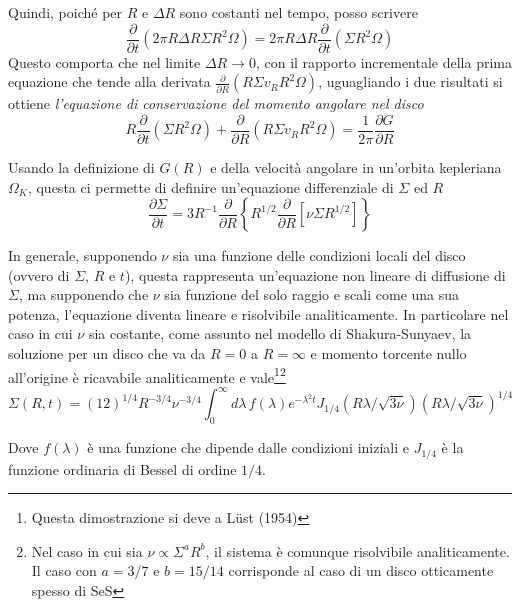 \documentclass[a4paperbi]{article}
\begin{document}
	Quindi, poiché per $R$ e $\Delta R$ sono costanti nel tempo, posso scrivere
	\begin{equation}
		\frac{\partial}{\partial t}(2\pi R\Delta R\Sigma R^2\Omega)=2\pi R\Delta R\frac{\partial}{\partial t}(\Sigma R^2\Omega)
	\end{equation}
	Questo comporta che nel limite $\Delta R\rightarrow 0$, con il rapporto incrementale della prima equazione che tende alla derivata $\frac{\partial}{\partial R}(R\Sigma v_R R^2\Omega)$, uguagliando i due risultati si ottiene \textit{l'equazione di conservazione del momento angolare nel disco}
	\begin{equation}
		R\frac{\partial}{\partial t}(\Sigma R^2\Omega)+\frac{\partial}{\partial R}(R\Sigma v_R R^2\Omega)=\frac{1}{2\pi}\frac{\partial G}{\partial R}
	\end{equation}
	
	Usando la definizione di $G(R)$ e della velocità angolare in un'orbita kepleriana $\Omega_K$,  questa ci permette di definire un'equazione differenziale di $\Sigma$ ed $R$
	\begin{equation}
		\frac{\partial\Sigma}{\partial t}=3R^{-1}\frac{\partial}{\partial R}\left\{R^{1/2}\frac{\partial}{\partial R}\left[\nu\Sigma R^{1/2}\right]\right\}
	\end{equation}
	
	In generale, supponendo $\nu$ sia una funzione delle condizioni locali del disco (ovvero di $\Sigma$, $R$ e $t$), questa rappresenta un'equazione non lineare di diffusione di $\Sigma$, ma supponendo che $\nu$ sia funzione del solo raggio e scali come una sua potenza, l'equazione diventa lineare e risolvibile analiticamente. In particolare nel caso in cui $\nu$ sia costante, come assunto nel modello di Shakura-Sunyaev, la soluzione per un disco che va da $R=0$ a $R=\infty$ e momento torcente nullo all'origine è ricavabile analiticamente e vale\footnote{Questa dimostrazione si deve a Lüst (1954)}\footnote{Nel caso in cui sia $\nu\propto\Sigma^aR^b$, il sistema è comunque risolvibile analiticamente. Il caso con $a=3/7$ e $b=15/14$ corrisponde al caso di un disco otticamente spesso di SeS}
	\begin{equation*}
		\Sigma(R,t)=(12)^{1/4}R^{-3/4}\nu^{-3/4}\int^{\infty}_0d\lambda\,f(\lambda)e^{-\lambda^2t}J_{1/4}(R\lambda/\sqrt{3\nu})(R\lambda/\sqrt{3\nu})^{1/4}
	\end{equation*}
	
	Dove $f(\lambda)$ è una funzione che dipende dalle condizioni iniziali e $J_{1/4}$ è la funzione ordinaria di Bessel di ordine $1/4$.
	
\end{document}
